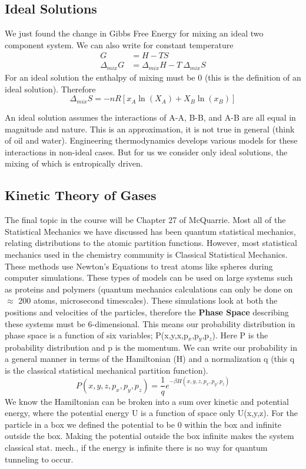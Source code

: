 \documentclass{article}
\begin{document}
\subsection*{Ideal Solutions}
We just found the change in Gibbs Free Energy for mixing an ideal two component system. 
We can also write for constant temperature
\begin{equation}
\begin{split}
    G &= H - TS \\
    \Delta_{mix}G &=  \Delta_{mix}H - T\ \Delta_{mix}S
\end{split}
\end{equation}
For an ideal solution the enthalpy of mixing must be 0 (this is the definition of an ideal solution).
Therefore 
\begin{equation}
\Delta_{mix}S = -nR\left[x_A\ln(X_A) + X_B \ln(x_B)\right]
\end{equation}

An ideal solution assumes the interactions of A-A, B-B, and A-B are all equal in magnitude and nature. 
This is an approximation, it is not true in general (think of oil and water).
Engineering thermodynamics develops various models for these interactions in non-ideal cases. 
But for us we consider only ideal solutions, the mixing of which is entropically driven. 

\subsection*{Kinetic Theory of Gases}
The final topic in the course will be Chapter 27 of McQuarrie. 
Most all of the Statistical Mechanics we have discussed has been quantum statistical mechanics, relating distributions to the atomic partition functions. 
However, most statistical mechanics used in the chemistry community is Classical Statistical Mechanics. 
These methods use Newton's Equations to treat atoms like spheres during computer simulations.
These types of models can be used on large systems such as proteins and polymers (quantum mechanics calculations can only be done on $\approx$ 200 atoms, microsecond timescales). 
These simulations look at both the positions and velocities of the particles, therefore the \textbf{Phase Space} describing these systems must be 6-dimensional. 
This means our probability distribution in phase space is a function of six variables; P(x,y,x,p$_x$,p$_y$,p$_z$).
Here P is the probability distribution and p is the momentum. 
We can write our probability in a general manner in terms of the Hamiltonian (H) and a normalization q (this q is the classical statistical mechanical partition function). 
\begin{equation}
    P(x,y,z,p_x,p_y,p_z) = \frac{1}{q}e^{-\beta H(x,y,z,p_x,p_y,p_z)}
\end{equation}
We know the Hamiltonian can be broken into a sum over kinetic and potential energy, where the potential energy U is a function of space only U(x,y,z). 
For the particle in a box we defined the potential to be 0 within the box and infinite outside the box. 
Making the potential outside the box infinite makes the system classical stat. mech., if the energy is infinite there is no way for quantum tunneling to occur.
\end{document}

